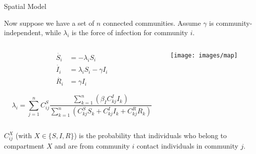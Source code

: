 \begin{slide}{Spatial Model}

Now suppose we have a set of $n$ connected communities.
Assume $\gamma$ is community-independent, while $\lambda_i$ is the force of infection for community $i$.
\begin{columns}[T]
	\begin{column}{.5\textwidth}
		\begin{align*}
			\dot{S_i}	&=	-\lambda_i S_i \\
			\dot{I_i}	&=	\lambda_i S_i - \gamma I_i \\
			\dot{R_i}	&=	\gamma I_i
		\end{align*}
		\begin{definition}
			$$\lambda_i = \sum_{j=1}^n C_{ij}^S \frac{ \sum_{k=1}^n ( \beta_I C_{kj}^I I_k ) }{ \sum_{k=1}^n ( C_{kj}^S S_k + C_{kj}^I I_k + C_{kj}^R R_k ) }$$
		\end{definition}
	\end{column}
	\begin{column}{.4\textwidth}
		\centering
		\texttt{[image: images/map]}	
	\end{column}	
\end{columns}

\vfill

$C_{ij}^X$ (with $X \in \{S,I,R\}$) is the probability that individuals who belong to compartment $X$ and are from community $i$ contact individuals in community $j$.

\end{slide}